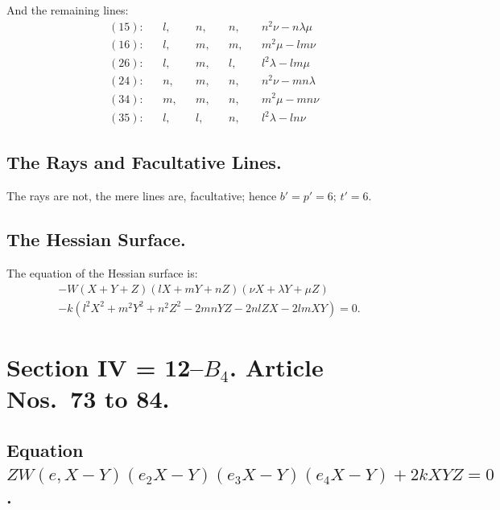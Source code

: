 \documentclass[11pt,a4paper]{article}
\begin{document}
And the remaining lines:
\begin{align*}
&(15): && l, && n, && n, && n^2\nu - n\lambda\mu \\
&(16): && l, && m, && m, && m^2\mu - lm\nu \\
&(26): && l, && m, && l, && l^2\lambda - lm\mu \\
&(24): && n, && m, && n, && n^2\nu - mn\lambda \\
&(34): && m, && m, && n, && m^2\mu - mn\nu \\
&(35): && l, && l, && n, && l^2\lambda - ln\nu
\end{align*}

\subsection*{The Rays and Facultative Lines.}

The rays are not, the mere lines are, facultative; hence $b' = p' = 6$; $t' = 6$.

\subsection*{The Hessian Surface.}

The equation of the Hessian surface is:
\begin{multline*}
-W(X+Y+Z)(lX+mY+nZ)(\nu X + \lambda Y + \mu Z) \\
- k(l^2X^2 + m^2Y^2 + n^2Z^2 - 2mnYZ - 2nlZX - 2lmXY) = 0.
\end{multline*}

\section*{Section IV = 12--$B_4$. \quad Article Nos.~73 to 84.}

\setcounter{section}{73}
\subsection*{Equation $ZW(e,X-Y)(e_2X-Y)(e_3X-Y)(e_4X-Y) + 2kXYZ = 0$.}
\end{document}
